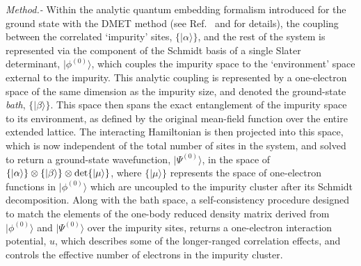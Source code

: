\documentclass[aps,showpacs,twocolumn,nobibnotes]{revtex4}
\begin{document}
\emph{Method.-} Within the analytic quantum embedding formalism introduced for the ground state with the DMET method (see 
Ref.~ and  for details), the coupling between the correlated `impurity' sites, $\{ |\alpha \rangle \}$, and the rest 
of the system is represented via the component of the Schmidt basis of a single Slater determinant, $|\phi^{(0)}\rangle$, which couples the impurity space to 
the `environment' space external to the impurity. This analytic coupling is represented by a one-electron space of the same dimension as 
the impurity size, and denoted the ground-state {\em bath}, $\{ |\beta \rangle \}$. This space then spans the exact entanglement of the 
impurity space to its environment, as defined by the original mean-field function over the entire extended lattice. The interacting Hamiltonian 
is then projected into this space, which is now independent of the total number of sites in the system, and solved to return a ground-state 
wavefunction, $|\Psi^{(0)} \rangle$, in the space of $\{ |\alpha \rangle \} \otimes \{ |\beta \rangle \} \otimes \text{\textnormal {det}} \{ | \mu \rangle \}$, where $\{ | \mu \rangle \}$ 
represents the space of one-electron functions in $|\phi^{(0)}\rangle$ which are uncoupled to the impurity cluster after its Schmidt decomposition. Along with the 
bath space, a self-consistency procedure designed to match the elements of the one-body reduced density matrix derived from $|\phi^{(0)}\rangle$ and $|\Psi^{(0)} \rangle$ over the impurity sites,
returns a one-electron interaction potential, $u$, which describes some of the longer-ranged correlation effects, and controls the effective number of electrons in the impurity cluster.
\end{document}
